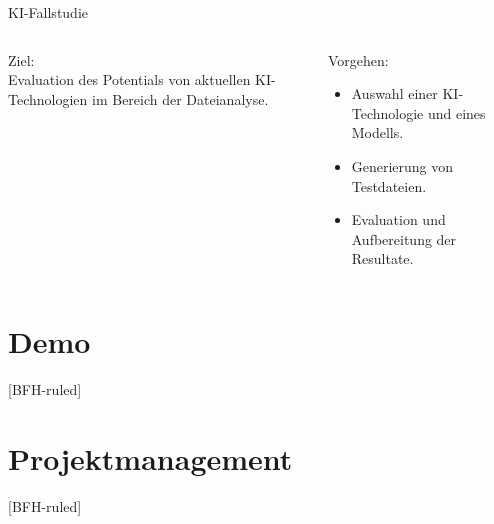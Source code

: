 \documentclass[
    ngerman,%
    authorontitle=true,
]{bfhbeamer}
\begin{document}
    \begin{frame}{KI-Fallstudie}
        \begin{columns}
            \begin{column}{0.5\textwidth}
                Ziel:\\
                Evaluation des Potentials von aktuellen KI-Technologien im Bereich der Dateianalyse.
            \end{column}
            \begin{column}{0.5\textwidth}
                Vorgehen:
                \begin{itemize}
                    \item Auswahl einer KI-Technologie und eines Modells.
                    \item Generierung von Testdateien.
                    \item Evaluation und Aufbereitung der Resultate.
                \end{itemize}
            \end{column}
        \end{columns}
    \end{frame}


    \section{Demo}\label{sec:demo}
    [BFH-ruled]
    \frame{\sectionpage}


    \section{Projektmanagement}\label{sec:projektmanagement}
    [BFH-ruled]
    \frame{\sectionpage}
\end{document}
